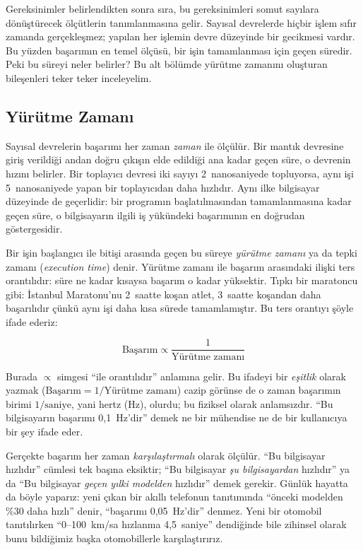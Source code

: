 Gereksinimler belirlendikten sonra sıra, bu gereksinimleri somut sayılara dönüştürecek ölçütlerin tanımlanmasına gelir. Sayısal devrelerde hiçbir işlem sıfır zamanda gerçekleşmez; yapılan her işlemin devre düzeyinde bir gecikmesi vardır. Bu yüzden başarımın en temel ölçüsü, bir işin tamamlanması için geçen süredir. Peki bu süreyi neler belirler? Bu alt bölümde yürütme zamanını oluşturan bileşenleri teker teker inceleyelim.

\subsection{Yürütme Zamanı}
\label{subsec:yurutme-zamani}

Sayısal devrelerin başarımı her zaman \emph{zaman} ile ölçülür. Bir mantık devresine giriş verildiği andan doğru çıkışın elde edildiği ana kadar geçen süre, o devrenin hızını belirler. Bir toplayıcı devresi iki sayıyı 2~nanosaniyede topluyorsa, aynı işi 5~nanosaniyede yapan bir toplayıcıdan daha hızlıdır. Aynı ilke bilgisayar düzeyinde de geçerlidir: bir programın başlatılmasından tamamlanmasına kadar geçen süre, o bilgisayarın ilgili iş yükündeki başarımının en doğrudan göstergesidir.

Bir işin başlangıcı ile bitişi arasında geçen bu süreye \emph{yürütme zamanı} ya da tepki zamanı (\emph{execution time}) denir. Yürütme zamanı ile başarım arasındaki ilişki ters orantılıdır: süre ne kadar kısaysa başarım o kadar yüksektir. Tıpkı bir maratoncu gibi: İstanbul Maratonu'nu 2~saatte koşan atlet, 3~saatte koşandan daha başarılıdır çünkü aynı işi daha kısa sürede tamamlamıştır. Bu ters orantıyı şöyle ifade ederiz:

\begin{equation}
\text{Başarım} \propto \frac{1}{\text{Yürütme zamanı}}
\label{eq:basarim}
\end{equation}

Burada $\propto$ simgesi ``ile orantılıdır'' anlamına gelir. Bu ifadeyi bir \emph{eşitlik} olarak yazmak ($\text{Başarım} = 1/\text{Yürütme zamanı}$) cazip görünse de o zaman başarımın birimi $1/\text{saniye}$, yani hertz (Hz), olurdu; bu fiziksel olarak anlamsızdır. ``Bu bilgisayarın başarımı 0,1~Hz'dir'' demek ne bir mühendise ne de bir kullanıcıya bir şey ifade eder.

Gerçekte başarım her zaman \emph{karşılaştırmalı} olarak ölçülür. ``Bu bilgisayar hızlıdır'' cümlesi tek başına eksiktir; ``Bu bilgisayar \emph{şu bilgisayardan} hızlıdır'' ya da ``Bu bilgisayar \emph{geçen yılki modelden} hızlıdır'' demek gerekir. Günlük hayatta da böyle yaparız: yeni çıkan bir akıllı telefonun tanıtımında ``önceki modelden \%30 daha hızlı'' denir, ``başarımı 0,05~Hz'dir'' denmez. Yeni bir otomobil tanıtılırken ``0--100~km/sa hızlanma 4,5~saniye'' dendiğinde bile zihinsel olarak bunu bildiğimiz başka otomobillerle karşılaştırırız.

